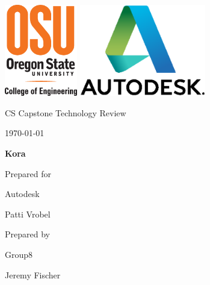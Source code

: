 \documentclass[onecolumn, draftclsnofoot,10pt, compsoc]{IEEEtran}
\def \CapstoneTeamNumber{8}
\def \GroupMemberOne{James Stallkamp}
\def \GroupMemberTwo{Jeremy Fischer}
\def \GroupMemberThree{Austin Row}
\def \CapstoneProjectName{Kora}
\def \CapstoneSponsorCompany{Autodesk}
\def \CapstoneSponsorPerson{Patti Vrobel}
\def \DocType{		
	Technology Review
}
\newcommand{\NameSigPair}[1]{\par
	\makebox[2.75in][r]{#1} \hfil 	\makebox[3.25in]{\makebox[2.25in]{\hrulefill} \hfill		\makebox[.75in]{\hrulefill}}
	\par\vspace{-12pt} \textit{\tiny\noindent
		\makebox[2.75in]{} \hfil		\makebox[3.25in]{\makebox[2.25in][r]{Signature} \hfill	\makebox[.75in][r]{Date}}}}
\renewcommand{\NameSigPair}[1]{#1}
\begin{document}
	\begin{titlepage}
		\begin{singlespace}
			\includegraphics[height=4cm]{coe.eps}
			\includegraphics[height=4cm]{autodesk.eps}   
			\par\vspace{.2in}
			\centering
			\scshape{
				\huge CS Capstone \DocType \par
				{\large\today}\par
				\vspace{.5in}
				\textbf{\Huge\CapstoneProjectName}\par
				\vfill
				{\large Prepared for}\par
				\Huge \CapstoneSponsorCompany\par
				\vspace{5pt}
				{\Large\NameSigPair{\CapstoneSponsorPerson}\par}
				{\large Prepared by }\par
				Group\CapstoneTeamNumber\par
				\vspace{5pt}
				{\Large
					\NameSigPair{\GroupMemberTwo}\par
				}
				\vspace{20pt}
			}
			\begin{abstract}

			\end{abstract}     
		\end{singlespace}
	\end{titlepage}
	\newpage
	\tableofcontents
	\clearpage
\end{document}
